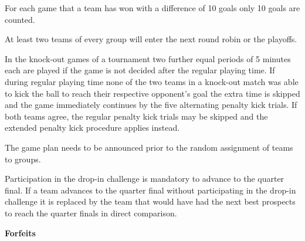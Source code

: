 For each game that a team has won with a difference of 10 goals only 10 goals are counted.

\bigskip

At least two teams of every group will enter the next round robin or the playoffs.

\bigskip

In the knock-out games of a tournament two further equal periods of 5 minutes each are played if the game is not decided after the regular playing time.  If during regular playing time none of the two teams in a knock-out match was able to kick the ball to reach their respective opponent's goal the extra time is skipped and the game immediately continues by the five alternating penalty kick trials. If both teams agree, the regular penalty kick trials may be skipped and the extended penalty kick procedure applies instead.

\bigskip


The game plan needs to be announced prior to the random assignment of teams to groups.


\bigskip

Participation in the drop-in challenge is mandatory to advance to the quarter final. If a team advances to the quarter final without participating in the drop-in challenge it is replaced by the team that would have had the next best prospects to reach the quarter finals in direct comparison.

\bigskip

{\bfseries Forfeits}

\headlinebox

